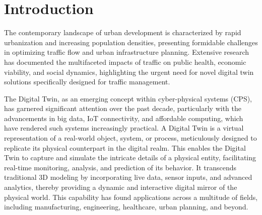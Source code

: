 \section{Introduction}

The contemporary landscape of urban development is characterized by rapid urbanization and increasing population densities, presenting formidable challenges in optimizing traffic flow and urban infrastructure planning. Extensive research has documented the multifaceted impacts of traffic on public health\cite{levy2010evaluation}, economic viability\cite{gorea2016financial}, and social dynamics\cite{anciaes2017social}, highlighting the urgent need for novel digital twin solutions specifically designed for traffic management.

The Digital Twin, as an emerging concept within cyber-physical systems (CPS), has garnered significant attention over the past decade, particularly with the advancements in big data, IoT connectivity, and affordable computing, which have rendered such systems increasingly practical\cite{guo2017mobile}\cite{singh2021digital}. A Digital Twin is a virtual representation of a real-world object, system, or process, meticulously designed to replicate its physical counterpart in the digital realm\cite{VANDERHORN2021113524}. This enables the Digital Twin to capture and simulate the intricate details of a physical entity, facilitating real-time monitoring, analysis, and prediction of its behavior. It transcends traditional 3D modeling by incorporating live data, sensor inputs, and advanced analytics, thereby providing a dynamic and interactive digital mirror of the physical world\cite{VANDERHORN2021113524}. This capability has found applications across a multitude of fields, including manufacturing, engineering, healthcare, urban planning, and beyond.

